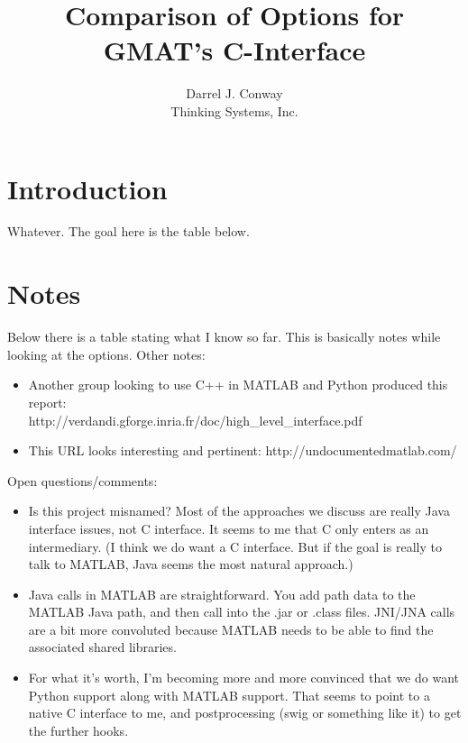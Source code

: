 \documentclass[10pt,letterpaper]{article}
\author{Darrel J. Conway\\Thinking Systems, Inc.}
\title{Comparison of Options for GMAT's C-Interface  }
\begin{document}
\maketitle
{}

\section{Introduction}

Whatever.  The goal here is the table below.

\section{Notes}

Below there is a table stating what I know so far.  This is basically notes while looking at the options.  Other notes:

\begin{itemize}
\item Another group looking to use C++ in MATLAB and Python produced this report:\\ http://verdandi.gforge.inria.fr/doc/high\_level\_interface.pdf
\item This URL looks interesting and pertinent:  http://undocumentedmatlab.com/
\end{itemize}

\noindent Open questions/comments:

\begin{itemize}
\item Is this project misnamed?  Most of the approaches we discuss are really Java interface issues, not C interface.  It seems to me that C only enters as an intermediary.  (I think we do want a C interface.  But if the goal is really to talk to MATLAB, Java seems the most natural approach.)
\item Java calls in MATLAB are straightforward.  You add path data to the MATLAB Java path, and then call into the .jar or .class files.  JNI/JNA calls are a bit more convoluted because MATLAB needs to be able to find the associated shared libraries.
\item For what it's worth, I'm becoming more and more convinced that we do want Python support along with MATLAB support.  That seems to point to a native C interface to me, and postprocessing (swig or something like it) to get the further hooks.
\end{itemize}
\end{document}
